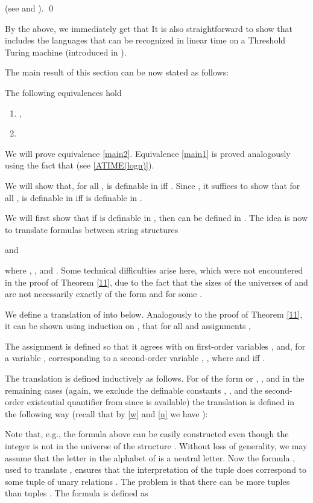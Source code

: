 \documentclass{LMCS}
\begin{document}
  (see  \cite{ruz80} and \cite{vol99}).
\qed

\begin{rem} By the above, we immediately get that     It is also straightforward to show that   includes the languages that can be recognized in  linear time on a Threshold Turing machine (introduced in  \cite{pasc88}).
\end{rem}

The main result of  this section can be now stated as follows:
\begin{thm}\label{compres}The following equivalences hold
\begin{enumerate}[\em(1)]
\item\label{main1} , 
\item\label{main2} 
\end{enumerate}
\end{thm}
\proof We will prove equivalence \ref{main2}. Equivalence \ref{main1} is proved  analogously using the fact that 
  (see  \eqref{ATIME(logn)}).

 We will show that,  for all ,   is definable in   iff . Since , it suffices to show that for all ,   is definable in   iff  is definable in  . 


We will first
show that if  is definable in  , then  can be defined in .
The idea is now to translate formulas between  string structures 

  and

  where  , , and . Some technical difficulties arise here, which were not encountered  in the proof of  Theorem \ref{11}, due to the fact that the sizes of the universes of   and  are not necessarily exactly of the form  and  for some . 

We define a translation    of    into   below. 
Analogously to the  proof of  Theorem \ref{11},  it can be shown using  induction  on ,  that for all   and assignments ,
 
The assignment  is defined  so that it agrees with  on first-order variables , and, for a variable , corresponding to a second-order variable  , , where  and  iff . 

The translation   is defined inductively as follows.
For  of the form  or , , and in the remaining  cases (again, we exclude the definable constants , , and the  second-order existential quantifier from  since  is available) the translation  is defined in the following way  (recall that by  \eqref{w} and \eqref{n} we have  ):

Note that, e.g.,  the formula  above can be easily constructed even though  the integer  
is not in the universe of the structure .   Without loss of generality,    we may  assume that the letter  in the alphabet   of  is a neutral letter. Now 
the formula , used to translate , ensures that the interpretation  of the tuple  does correspond to some tuple of unary relations . The problem is that there can be more tuples  than tuples . The formula  is defined as
\end{document}
